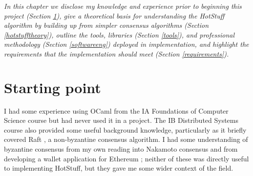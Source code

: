 



\textit{In this chapter we disclose my knowledge and experience prior to beginning this project (Section \ref{start}), give a theoretical basis for understanding the HotStuff algorithm by building up from simpler consensus algorithms (Section \ref{hotstufftheory}), outline the tools, libraries (Section \ref{tools}), and professional methodology (Section \ref{softwareeng}) deployed in implementation, and highlight the requirements that the implementation should meet (Section \ref{requirements}).}

\section{Starting point} \label{start}
I had some experience using OCaml from the IA Foundations of Computer Science course but had never used it in a project. The IB Distributed Systems course also provided some useful background knowledge, particularly as it briefly covered Raft \cite{ongaroSearchUnderstandableConsensus2014}, a non-byzantine consensus algorithm. I had some understanding of byzantine consensus from my own reading into Nakamoto consensus \cite{nakamotoBitcoinPeertoPeerElectronic2008} and from developing a wallet application for Ethereum \cite{ethereumWhite, ethereumYellow}; neither of these was directly useful to implementing HotStuff, but they gave me some wider context of the field.

